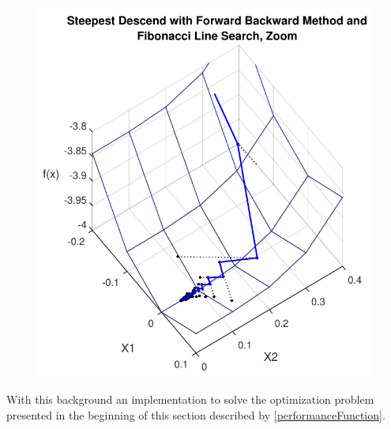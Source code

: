 \begin{minipage}{\linewidth}
\begin{minipage}{0.45\linewidth}
\begin{figure}[H]
			\includegraphics[scale=.62]{figures/gradientForwardBackwardAndFibonacciZoom}
			\centering
			\captionsetup{justification=centering}
			\label{gradientForwardBackwardAndFibonacciZoom}
		\end{figure}
	\end{minipage}
\end{minipage}

With this background an implementation to solve the optimization problem presented in the beginning of this section described by \eqref{performanceFunction}.